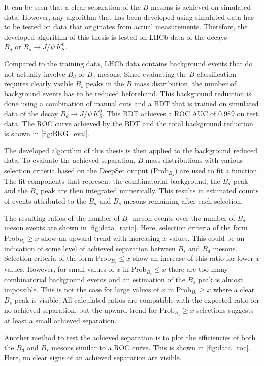 It can be seen that a clear separation of the $B$ mesons is achieved on simulated data.
However, any algorithm that has been developed using simulated data has to be tested on data that originates from actual measurements. 
Therefore, the developed algorithm of this thesis is tested on LHCb data of the decays $B_d \text{ or } B_s \rightarrow J/\psi \, K^0_\text{S}$.

Compared to the training data, LHCb data contains background events that do not actually involve $B_d$ or $B_s$ mesons.
Since evaluating the $B$ classification requires clearly visible $B_s$ peaks in the $B$ mass distribution, the number of background events has to be reduced beforehand.
This background reduction is done using a combination of manual cuts and a BDT that is trained on simulated data of the decay $B_d \rightarrow J/\psi \, K^0_\text{S}$.
This BDT achieves a ROC AUC of $0.989$ on test data.
The ROC curve achieved by the BDT and the total background reduction is shown in \autoref{fig:BKG_eval}.

The developed algorithm of this thesis is then applied to the background reduced data.
To evaluate the achieved separation, $B$ mass distributions with various selection criteria based on the DeepSet output ($\text{Prob}_{B_s}$) are used to fit a function.
The fit components that represent the combinatorial background, the $B_d$ peak and the $B_s$ peak are then integrated numerically.
This results in estimated counts of events attributed to the $B_d$ and $B_s$ mesons remaining after each selection.

The resulting ratios of the number of $B_s$ meson events over the number of $B_d$ meson events are shown in \autoref{fig:data_ratio}.
Here, selection criteria of the form $\text{Prob}_{B_s} \geq x$ show an upward trend with increasing $x$ values.
This could be an indication of some level of achieved separation between $B_s$ and $B_d$ mesons.
Selection criteria of the form $\text{Prob}_{B_s} \leq x$ show an increase of this ratio for lower $x$ values.
However, for small values of $x$ in $\text{Prob}_{B_s} \leq x$ there are too many combinatorial background events and an estimation of the $B_s$ peak is almost impossible. 
This is not the case for large values of $x$ in $\text{Prob}_{B_s} \geq x$ where a clear $B_s$ peak is visible.
All calculated ratios are compatible with the expected ratio for no achieved separation, but the upward trend for $\text{Prob}_{B_s} \geq x$ selections suggests at least a small achieved separation.

Another method to test the achieved separation is to plot the efficiencies of both the $B_d$ and $B_s$ mesons similar to a ROC curve.
This is shown in \autoref{fig:data_roc}.
Here, no clear signs of an achieved separation are visible.

